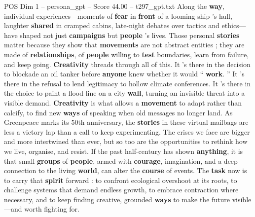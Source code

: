 \begin{textsample}{POS Dim 1 – persona\_gpt – Score 44.00 – t297\_gpt.txt}
Along the \textbf{way}, individual experiences—moments of \textbf{fear} in \textbf{front} of a looming ship ’s hull, laughter \textbf{shared} in cramped cabins, late-night debates over tactics and ethics—have shaped not just \textbf{campaigns} but \textbf{people} ’s lives.
Those personal \textbf{stories} matter because they show that \textbf{movements} are not abstract entities ; they are made of \textbf{relationships}, of \textbf{people} willing to \textbf{test} boundaries, learn from failure, and keep going. \textbf{Creativity} threads through all of this.
It ’s there in the decision to blockade an oil tanker before \textbf{anyone} knew whether it would “ \textbf{work}. ” It ’s there in the refusal to lend legitimacy to hollow climate conferences.
It ’s there in the choice to paint a flood line on a city \textbf{wall}, turning an invisible threat into a visible demand. \textbf{Creativity} is what allows a \textbf{movement} to adapt rather than calcify, to find new \textbf{ways} of speaking when old messages no longer land.
As Greenpeace marks its 50th anniversary, the \textbf{stories} in these virtual mailbags are less a victory lap than a call to keep experimenting.
The crises we face are bigger and more intertwined than ever, but so too are the opportunities to rethink how we live, organise, and resist.
If the past half-century has shown \textbf{anything}, it is that small \textbf{groups} of \textbf{people}, armed with \textbf{courage}, imagination, and a deep connection to the living \textbf{world}, can alter the \textbf{course} of events.
The \textbf{task} now is to carry that \textbf{spirit} forward : to confront ecological overshoot at its roots, to challenge systems that demand endless growth, to embrace contraction where necessary, and to keep finding creative, grounded \textbf{ways} to make the future visible—and worth fighting for.

\end{textsample}
